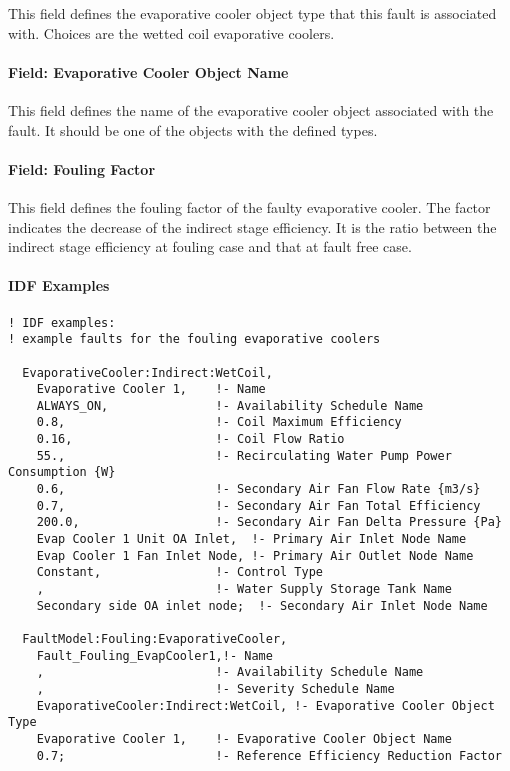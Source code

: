 This field defines the evaporative cooler object type that this fault is associated with. Choices are the wetted coil evaporative coolers.

\paragraph{Field: Evaporative Cooler Object Name}\label{field-evaporative-cooler-object-name}

This field defines the name of the evaporative cooler object associated with the fault. It should be one of the objects with the defined types.

\paragraph{Field: Fouling Factor}\label{field-fouling-factor}

This field defines the fouling factor of the faulty evaporative cooler. The factor indicates the decrease of the indirect stage efficiency. It is the ratio between the indirect stage efficiency at fouling case and that at fault free case.

\paragraph{IDF Examples}

\begin{lstlisting}
! IDF examples:
! example faults for the fouling evaporative coolers

  EvaporativeCooler:Indirect:WetCoil,
    Evaporative Cooler 1,    !- Name
    ALWAYS_ON,               !- Availability Schedule Name
    0.8,                     !- Coil Maximum Efficiency
    0.16,                    !- Coil Flow Ratio
    55.,                     !- Recirculating Water Pump Power Consumption {W}
    0.6,                     !- Secondary Air Fan Flow Rate {m3/s}
    0.7,                     !- Secondary Air Fan Total Efficiency
    200.0,                   !- Secondary Air Fan Delta Pressure {Pa}
    Evap Cooler 1 Unit OA Inlet,  !- Primary Air Inlet Node Name
    Evap Cooler 1 Fan Inlet Node, !- Primary Air Outlet Node Name
    Constant,                !- Control Type
    ,                        !- Water Supply Storage Tank Name
    Secondary side OA inlet node;  !- Secondary Air Inlet Node Name

  FaultModel:Fouling:EvaporativeCooler,
    Fault_Fouling_EvapCooler1,!- Name
    ,                        !- Availability Schedule Name
    ,                        !- Severity Schedule Name
    EvaporativeCooler:Indirect:WetCoil, !- Evaporative Cooler Object Type
    Evaporative Cooler 1,    !- Evaporative Cooler Object Name
    0.7;                     !- Reference Efficiency Reduction Factor

\end{lstlisting}


